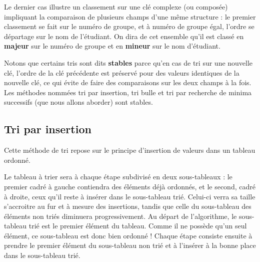 \documentclass[11pt,a4paper]{article}
\begin{document}
            \par
        
        Le dernier cas illustre un classement sur une cl\'e complexe (ou compos\'ee) impliquant la
        comparaison de plusieurs champs d'une m\^eme structure : le premier classement se fait sur le
        num\'ero de groupe, et \`a num\'ero de groupe \'egal, l'ordre se d\'epartage sur le nom de l'\'etudiant.
        On dira de cet ensemble qu'il est class\'e en \textbf{majeur}
        sur le num\'ero de groupe et en \textbf{mineur} sur le nom d'\'etudiant.
      
            \par
        
        Notons que certains tris sont dits \textbf{stables} 
        parce qu'en cas de tri sur une nouvelle cl\'e, l'ordre
        de la cl\'e pr\'ec\'edente est pr\'eserv\'e pour des valeurs identiques de la nouvelle cl\'e, ce qui \'evite
        de faire des comparaisons sur les deux champs \`a la fois. Les m\'ethodes nomm\'ees tri par
        insertion, tri bulle et tri par recherche de minima successifs (que nous allons aborder)
        sont stables.
      
            \par
        \subsection{Tri par insertion}
		    Cette m\'ethode de tri repose sur le principe d'insertion de valeurs dans un tableau ordonn\'e.
      
            \par
        
        Le tableau \`a trier sera \`a chaque \'etape subdivis\'e en deux sous-tableaux : le premier cadr\'e \`a
        gauche contiendra des \'el\'ements d\'ej\`a ordonn\'es, et le second, cadr\'e \`a droite, ceux qu'il reste
        \`a ins\'erer dans le sous-tableau tri\'e. Celui-ci verra sa taille s'accroitre au fur et \`a mesure des
        insertions, tandis que celle du sous-tableau des \'el\'ements non tri\'es diminuera progressivement.
        Au d\'epart de l'algorithme, le sous-tableau tri\'e est le premier \'el\'ement du tableau. Comme il
        ne poss\`ede qu'un seul \'el\'ement, ce sous-tableau est donc bien ordonn\'e ! Chaque \'etape consiste
        ensuite \`a prendre le premier \'el\'ement du sous-tableau non tri\'e et \`a l'ins\'erer \`a la bonne place
        dans le sous-tableau tri\'e.
		  
\end{document}
